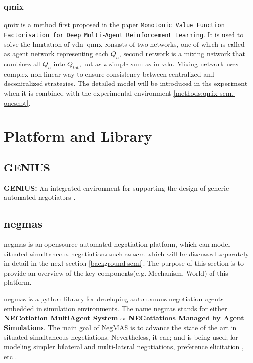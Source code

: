 \subsubsection{\gls{qmix}}
\gls{qmix} is a method first proposed in the paper \texttt{Monotonic Value Function Factorisation for Deep Multi-Agent Reinforcement Learning}\parencite{Rashid2018}. It is used to solve the limitation of \gls{vdn}. \gls{qmix} consists of two networks, one of which is called as agent network representing each $Q_a$, second network is a mixing network that combines all $Q_a$ into $Q_{tot}$, not as a simple sum as in \gls{vdn}. Mixing network uses complex non-linear way to ensure consistency between centralized and decentralized strategies. The detailed model will be introduced in the experiment when it is combined with the experimental environment \ref{methods:qmix-scml-oneshot}.

\section{Platform and Library}
\subsection{GENIUS}
\textbf{GENIUS:} An integrated environment for supporting the design of generic automated negotiators \parencite{Lin2014}.

\subsection{\gls{negmas}} \label{background:negmas}
\gls{negmas} is an opensource automated negotiation platform, which can model situated simultaneous negotiations such as \gls{scm} which will be discussed separately in detail in the next section \ref{background-scml}. The purpose of this section is to provide an overview of the key components(e.g. Mechanism, World) of this platform.

\gls{negmas} is a python library for developing autonomous negotiation agents embedded in simulation environments. The name negmas stands for either \textbf{NEGotiation MultiAgent System} or \textbf{NEGotiations Managed by Agent Simulations}. The main goal of NegMAS is to advance the state of the art in situated simultaneous negotiations. Nevertheless, it can; and is being used; for modeling simpler bilateral and multi-lateral negotiations, preference elicitation , etc \parencite{Mohammad2019}.


